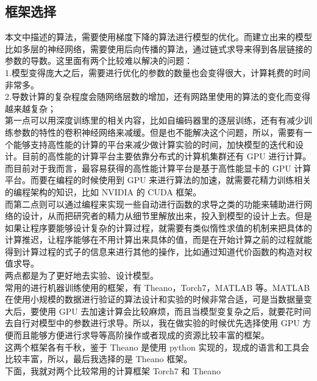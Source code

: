 \subsection{框架选择}\label{ux6846ux67b6ux9009ux62e9}

本文中描述的算法，需要使用梯度下降的算法进行模型的优化。而建立出来的模型比如多层的神经网络，需要使用后向传播的算法，通过链式求导来得到各层链接的参数的导数。这里面有两个比较难以解决的问题：\\1.模型变得庞大之后，需要进行优化的参数的数量也会变得很大，计算耗费的时间非常多。\\2.导数计算的复杂程度会随网络层数的增加，还有网路里使用的算法的变化而变得越来越复杂；\\第一点可以用深度训练里的相关内容，比如自编码器里的逐层训练，还有有减少训练参数的特性的卷积神经网络来减缓。但是也不能解决这个问题，所以，需要有一个能够支持高性能的计算的平台来减少做计算实验的时间，加快模型的迭代和设计。目前的高性能的计算平台主要依靠分布式的计算机集群还有
GPU
进行计算。而目前对于我而言，最容易获得的高性能计算平台是基于高性能显卡的
GPU 计算平台。而要在编程的时候使用到 GPU
来进行算法的加速，就需要花精力训练相关的编程架构的知识，比如 NVIDIA 的
CUDA
框架。\\而第二点则可以通过编程来实现一些自动进行函数的求导之类的功能来辅助进行网络的设计，从而把研究者的精力从细节里解放出来，投入到模型的设计上去。但是如果让程序要能够设计复杂的计算过程，就需要有类似惰性求值的机制来把具体的计算推迟，让程序能够在不用计算出来具体的值，而是在开始计算之前的过程就能得到计算过程的式子的信息来进行其他的操作，比如通过知道代价函数的构造对权值求导。\\两点都是为了更好地去实验、设计模型。\\常用的进行机器训练使用的框架，有
Theano，Torch7，MATLAB 等。MATLAB
在使用小规模的数据进行验证的算法设计和实验的时候非常合适，可是当数据量变大后，要使用
GPU
去加速计算会比较麻烦，而且当模型变复杂之后，就要花时间去自行对模型中的参数进行求导。所以，我在做实验的时候优先选择使用
GPU
方便而且能够方便进行求导等高阶操作或者现成的资源比较丰富的框架。\\这两个框架各有千秋，鉴于
Theano 是使用 python
实现的，现成的语言和工具会比较丰富，所以，最后我选择的是 Theano
框架。\\下面，我就对两个比较常用的计算框架 Torch7 和 Theano
